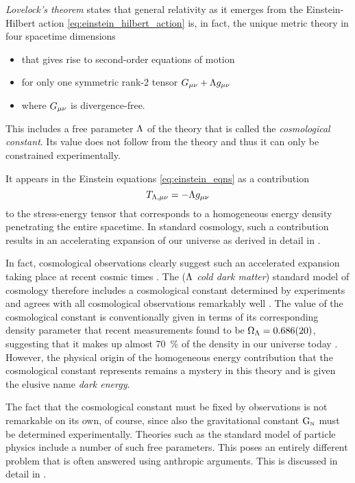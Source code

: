 \documentclass[12pt,parskip=half]{scrreprt}
\begin{document}
\emph{Lovelock's theorem}\label{sec:lovelock} \autocite{Lovelock1971,Navarro2011,Clifton2012} states that general relativity as it emerges from the Einstein-Hilbert action \ref{eq:einstein_hilbert_action} is, in fact, the unique metric theory in four spacetime dimensions
\begin{itemize}
	\item that gives rise to second-order equations of motion
	\item for only one symmetric rank-2 tensor \(G_{\mu\nu} + \Lambda g_{\mu\nu}\)
	\item where \(G_{\mu\nu}\) is divergence-free. 
\end{itemize}
This includes a free parameter \(\Lambda\) of the theory that is called the \emph{cosmological constant}. Its value does not follow from the theory and thus it can only be constrained experimentally.

It appears in the Einstein equations \ref{eq:einstein_eqns} as a contribution
\begin{equation}
	T_{\Lambda\textnormal{,}\mu\nu} = - \Lambda g_{\mu\nu}
\end{equation}
to the stress-energy tensor that corresponds to a homogeneous energy density penetrating the entire spacetime. In standard \FLRW cosmology, such a contribution results in an accelerating expansion of our universe as derived in detail in .

In fact, cosmological observations clearly suggest such an accelerated expansion taking place at recent cosmic times \autocite{Perlmutter2003}. The \LCDM (\emph{\(\Lambda\) cold dark matter}) standard model of cosmology therefore includes a cosmological constant determined by experiments and agrees with all cosmological observations remarkably well \autocite{Planck2015}. The value of the cosmological constant is conventionally given in terms of its corresponding density parameter that recent measurements found to be \(\Omega_\Lambda = \SI{0.686+-0.020}{}\), suggesting that it makes up almost \SI{70}{\percent} of the density in our universe today \autocite{Planck2013Data}. However, the physical origin of the homogeneous energy contribution that the cosmological constant represents remains a mystery in this theory and is given the elusive name \emph{dark energy}.

The fact that the cosmological constant must be fixed by observations is not remarkable on its own, of course, since also the gravitational constant \(\mathrm{G}_\textnormal{\tiny{N}}\) must be determined experimentally. Theories such as the standard model of particle physics include a number of such free parameters. This poses an entirely different problem that is often answered using anthropic arguments. This is discussed in detail in . 
\end{document}
